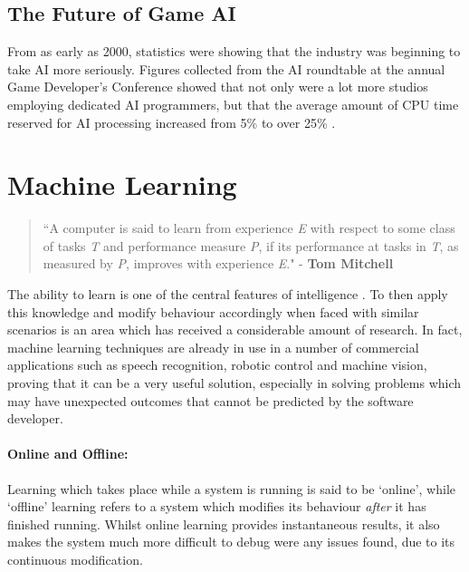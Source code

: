 \documentclass[a4paper,oneside]{report}
\begin{document}
\subsection{The Future of Game AI}

From as early as 2000, statistics were showing that the industry was beginning to take AI more seriously. Figures collected from the AI roundtable at the annual Game Developer's Conference showed that not only were a lot more studios employing dedicated AI programmers, but that the average amount of CPU time reserved for AI processing increased from 5\% to over 25\% \cite{Woodcock:oq}.

\section{Machine Learning}

\begin{quotation}``A computer is said to learn from experience \emph{E} with respect to some class of tasks \emph{T} and performance measure \emph{P}, if its performance at tasks in \emph{T}, as measured by \emph{P}, improves with experience \emph{E}." - \textbf{Tom Mitchell} \cite{mitchell1997machine} 
\end{quotation}

The ability to learn is one of the central features of intelligence \cite{Langley:1996zr}. To then apply this knowledge and modify behaviour accordingly when faced with similar scenarios is an area which has received a considerable amount of research. In fact, machine learning techniques are already in use in a number of commercial applications such as speech recognition, robotic control and machine vision, proving that it can be a very useful solution, especially in solving problems which may have unexpected outcomes that cannot be predicted by the software developer.

\paragraph{Online and Offline:} Learning which takes place while a system is running is said to be `online', while `offline' learning refers to a system which modifies its behaviour \emph{after} it has finished running. Whilst online learning provides instantaneous results, it also makes the system much more difficult to debug were any issues found, due to its continuous modification.
\end{document}
